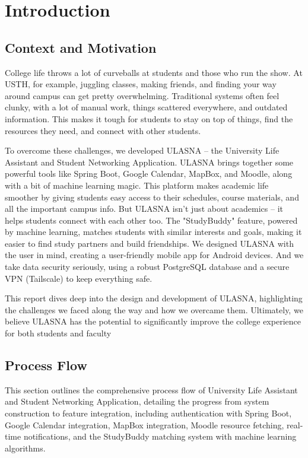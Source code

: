 \documentclass{article}
\begin{document}


\tableofcontents
\newpage

\listfigurename
\newpage

\listtablename
\newpage



\section{Introduction}

\subsection{Context and Motivation}
College life throws a lot of curveballs at students and those who run the show. At USTH, for example, juggling classes, making friends, and finding your way around campus can get pretty overwhelming. 
Traditional systems often feel clunky, with a lot of manual work, things scattered everywhere, and outdated information. This makes it tough for students to stay on top of things, find the resources they need, and connect with other students.

To overcome these challenges, we developed ULASNA – the University Life Assistant and Student Networking Application. ULASNA brings together some powerful tools like Spring Boot, Google Calendar, MapBox, and Moodle, along with a bit of machine learning magic.
This platform makes academic life smoother by giving students easy access to their schedules, course materials, and all the important campus info. But ULASNA isn't just about academics – it helps students connect with each other too. The "StudyBuddy" feature, powered by machine learning, matches students with similar interests and goals, making it easier to find study partners and build friendships.
We designed ULASNA with the user in mind, creating a user-friendly mobile app for Android devices. And we take data security seriously, using a robust PostgreSQL database and a secure VPN (Tailscale) to keep everything safe.

This report dives deep into the design and development of ULASNA, highlighting the challenges we faced along the way and how we overcame them. Ultimately, we believe ULASNA has the potential to significantly improve the college experience for both students and faculty\subsection{Process Flow}
This section outlines the comprehensive process flow of University Life Assistant and Student Networking Application,
detailing the progress from system construction to feature integration,
including authentication with Spring Boot, Google Calendar integration, MapBox integration, Moodle resource fetching, real-time notifications, and the StudyBuddy matching system with machine learning algorithms.
\end{document}

